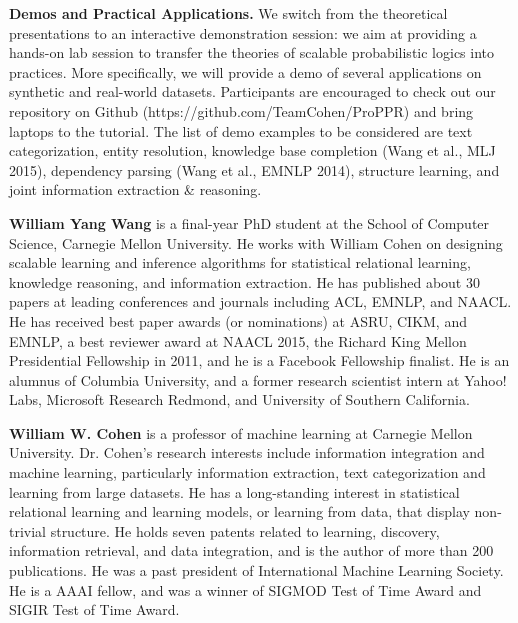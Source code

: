 \begin{tutorial}
{\bfseries Demos and Practical Applications.} We switch from the theoretical presentations to an interactive demonstration session: we aim at providing a hands-on lab session to transfer the theories of scalable probabilistic logics into practices. More specifically, we will provide a demo of several applications on synthetic and real-world datasets. Participants are encouraged to check out our repository on Github (https://github.com/TeamCohen/ProPPR) and bring laptops to the tutorial. The list of demo examples to be considered are text categorization, entity resolution, knowledge base completion (Wang et al., MLJ 2015), dependency parsing (Wang et al., EMNLP 2014), structure learning, and joint information extraction \& reasoning.
\end{tutorial}

\begin{bio}
  {\bfseries William Yang Wang} is a final-year PhD student at the School of Computer Science, Carnegie Mellon University. He works with William Cohen on designing scalable learning and inference algorithms for statistical relational learning, knowledge reasoning, and information extraction. He has published about 30 papers at leading conferences and journals including ACL, EMNLP, and NAACL. He has received best paper awards (or nominations) at ASRU, CIKM, and EMNLP, a best reviewer award at NAACL 2015, the Richard King Mellon Presidential Fellowship in 2011, and he is a Facebook Fellowship finalist. He is an alumnus of Columbia University, and a former research scientist intern at Yahoo! Labs, Microsoft Research Redmond, and University of Southern California. 

  {\bfseries William W. Cohen} is a professor of machine learning at Carnegie Mellon University. Dr. Cohen's research interests include information integration and machine learning, particularly information extraction, text categorization and learning from large datasets. He has a long-standing interest in statistical relational learning and learning models, or learning from data, that display non-trivial structure. He holds seven patents related to learning, discovery, information retrieval, and data integration, and is the author of more than 200 publications. He was a past president of International Machine Learning Society. He is a AAAI fellow, and was a winner of SIGMOD Test of Time Award and SIGIR Test of Time Award. 
\end{bio}


